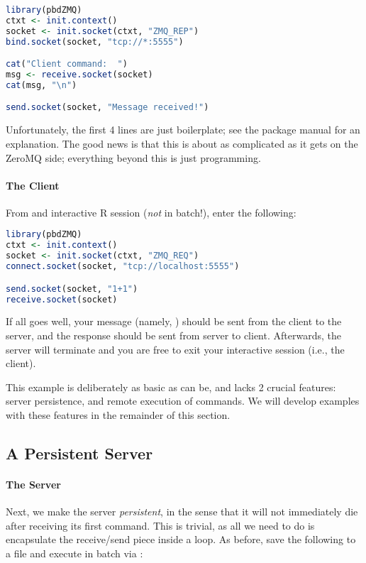 \begin{lstlisting}[language=R,title=Server]
library(pbdZMQ)
ctxt <- init.context()
socket <- init.socket(ctxt, "ZMQ_REP")
bind.socket(socket, "tcp://*:5555")

cat("Client command:  ")
msg <- receive.socket(socket)
cat(msg, "\n")

send.socket(socket, "Message received!")
\end{lstlisting}

Unfortunately, the first 4 lines are just boilerplate; see the package manual
for an explanation.  The good news is that this is about as complicated as
it gets on the ZeroMQ side; everything beyond this is just 
programming.

\paragraph{The Client}
From and interactive R session (\emph{not} in batch!), enter the
following:

\begin{lstlisting}[language=R,title=Client]
library(pbdZMQ)
ctxt <- init.context()
socket <- init.socket(ctxt, "ZMQ_REQ")
connect.socket(socket, "tcp://localhost:5555")

send.socket(socket, "1+1")
receive.socket(socket)
\end{lstlisting}

If all goes well, your message (namely, ) should be sent from the
client to the server, and the response  should be 
sent from server to client.  Afterwards, the server will terminate and you are
free to exit your interactive  session (i.e., the client).  

This example is deliberately as basic as can be, and lacks 2 crucial
features:  server persistence, and remote execution of commands.  We will
develop examples with these features in the remainder of this section.




\subsection{A Persistent Server}

\paragraph{The Server}
Next, we make the server \emph{persistent}, in the sense that it will not
immediately die after receiving its first command.  This is trivial, as all
we need to do is encapsulate the receive/send piece inside a  loop.
As before, save the following to a file and execute in batch via :

